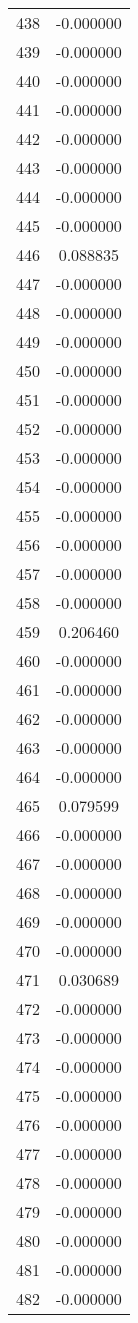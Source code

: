 \documentclass[12pt]{article}
\begin{document}
\begin{longtable}{@{}cc@{}}
438 & -0.000000 \\
439 & -0.000000 \\
440 & -0.000000 \\
441 & -0.000000 \\
442 & -0.000000 \\
443 & -0.000000 \\
444 & -0.000000 \\
445 & -0.000000 \\
446 & 0.088835 \\
447 & -0.000000 \\
448 & -0.000000 \\
449 & -0.000000 \\
450 & -0.000000 \\
451 & -0.000000 \\
452 & -0.000000 \\
453 & -0.000000 \\
454 & -0.000000 \\
455 & -0.000000 \\
456 & -0.000000 \\
457 & -0.000000 \\
458 & -0.000000 \\
459 & 0.206460 \\
460 & -0.000000 \\
461 & -0.000000 \\
462 & -0.000000 \\
463 & -0.000000 \\
464 & -0.000000 \\
465 & 0.079599 \\
466 & -0.000000 \\
467 & -0.000000 \\
468 & -0.000000 \\
469 & -0.000000 \\
470 & -0.000000 \\
471 & 0.030689 \\
472 & -0.000000 \\
473 & -0.000000 \\
474 & -0.000000 \\
475 & -0.000000 \\
476 & -0.000000 \\
477 & -0.000000 \\
478 & -0.000000 \\
479 & -0.000000 \\
480 & -0.000000 \\
481 & -0.000000 \\
482 & -0.000000 \\

\end{longtable}
\end{document}
